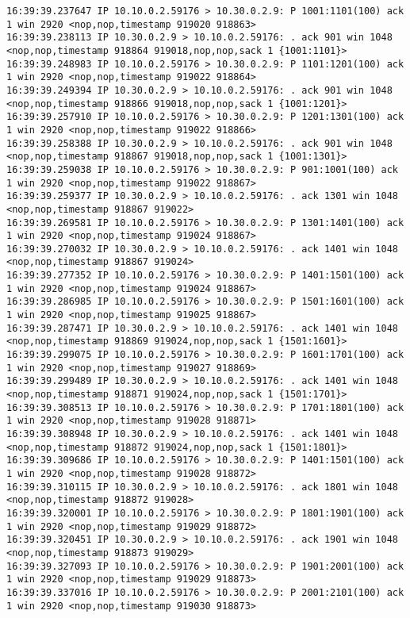 \documentclass[a4paper,12pt]{article}
\begin{document}
\begin{Verbatim}
16:39:39.237647 IP 10.10.0.2.59176 > 10.30.0.2.9: P 1001:1101(100) ack 1 win 2920 <nop,nop,timestamp 919020 918863>
16:39:39.238113 IP 10.30.0.2.9 > 10.10.0.2.59176: . ack 901 win 1048 <nop,nop,timestamp 918864 919018,nop,nop,sack 1 {1001:1101}>
16:39:39.248983 IP 10.10.0.2.59176 > 10.30.0.2.9: P 1101:1201(100) ack 1 win 2920 <nop,nop,timestamp 919022 918864>
16:39:39.249394 IP 10.30.0.2.9 > 10.10.0.2.59176: . ack 901 win 1048 <nop,nop,timestamp 918866 919018,nop,nop,sack 1 {1001:1201}>
16:39:39.257910 IP 10.10.0.2.59176 > 10.30.0.2.9: P 1201:1301(100) ack 1 win 2920 <nop,nop,timestamp 919022 918866>
16:39:39.258388 IP 10.30.0.2.9 > 10.10.0.2.59176: . ack 901 win 1048 <nop,nop,timestamp 918867 919018,nop,nop,sack 1 {1001:1301}>
16:39:39.259038 IP 10.10.0.2.59176 > 10.30.0.2.9: P 901:1001(100) ack 1 win 2920 <nop,nop,timestamp 919022 918867>
16:39:39.259377 IP 10.30.0.2.9 > 10.10.0.2.59176: . ack 1301 win 1048 <nop,nop,timestamp 918867 919022>
16:39:39.269581 IP 10.10.0.2.59176 > 10.30.0.2.9: P 1301:1401(100) ack 1 win 2920 <nop,nop,timestamp 919024 918867>
16:39:39.270032 IP 10.30.0.2.9 > 10.10.0.2.59176: . ack 1401 win 1048 <nop,nop,timestamp 918867 919024>
16:39:39.277352 IP 10.10.0.2.59176 > 10.30.0.2.9: P 1401:1501(100) ack 1 win 2920 <nop,nop,timestamp 919024 918867>
16:39:39.286985 IP 10.10.0.2.59176 > 10.30.0.2.9: P 1501:1601(100) ack 1 win 2920 <nop,nop,timestamp 919025 918867>
16:39:39.287471 IP 10.30.0.2.9 > 10.10.0.2.59176: . ack 1401 win 1048 <nop,nop,timestamp 918869 919024,nop,nop,sack 1 {1501:1601}>
16:39:39.299075 IP 10.10.0.2.59176 > 10.30.0.2.9: P 1601:1701(100) ack 1 win 2920 <nop,nop,timestamp 919027 918869>
16:39:39.299489 IP 10.30.0.2.9 > 10.10.0.2.59176: . ack 1401 win 1048 <nop,nop,timestamp 918871 919024,nop,nop,sack 1 {1501:1701}>
16:39:39.308513 IP 10.10.0.2.59176 > 10.30.0.2.9: P 1701:1801(100) ack 1 win 2920 <nop,nop,timestamp 919028 918871>
16:39:39.308948 IP 10.30.0.2.9 > 10.10.0.2.59176: . ack 1401 win 1048 <nop,nop,timestamp 918872 919024,nop,nop,sack 1 {1501:1801}>
16:39:39.309686 IP 10.10.0.2.59176 > 10.30.0.2.9: P 1401:1501(100) ack 1 win 2920 <nop,nop,timestamp 919028 918872>
16:39:39.310115 IP 10.30.0.2.9 > 10.10.0.2.59176: . ack 1801 win 1048 <nop,nop,timestamp 918872 919028>
16:39:39.320001 IP 10.10.0.2.59176 > 10.30.0.2.9: P 1801:1901(100) ack 1 win 2920 <nop,nop,timestamp 919029 918872>
16:39:39.320451 IP 10.30.0.2.9 > 10.10.0.2.59176: . ack 1901 win 1048 <nop,nop,timestamp 918873 919029>
16:39:39.327093 IP 10.10.0.2.59176 > 10.30.0.2.9: P 1901:2001(100) ack 1 win 2920 <nop,nop,timestamp 919029 918873>
16:39:39.337016 IP 10.10.0.2.59176 > 10.30.0.2.9: P 2001:2101(100) ack 1 win 2920 <nop,nop,timestamp 919030 918873>

\end{Verbatim}
\end{document}
